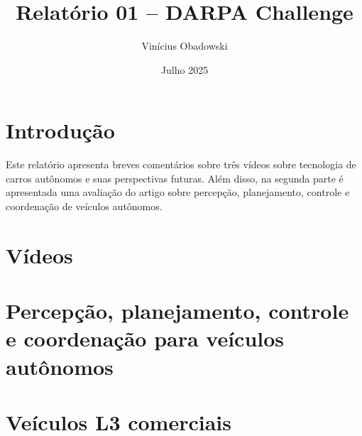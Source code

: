 \documentclass[12pt, a4paper]{article}
\title{Relatório 01 -- DARPA Challenge}
\author{Vinícius Obadowski}
\date{Julho 2025}
\begin{document}
\maketitle

\section{Introdução}

Este relatório apresenta breves comentários sobre três vídeos \cite{cleanerwatt,basicthinking,frankyoutube} sobre tecnologia de carros autônomos e suas perspectivas futuras. Além disso, na segunda parte é apresentada uma avaliação do artigo \cite{Pendleton2017Autonomous} sobre percepção, planejamento, controle e coordenação de veículos autônomos.

\section{Vídeos}



\section{Percepção, planejamento, controle e coordenação para veículos autônomos}



\section{Veículos L3 comerciais}



% 
\printbibliography
\end{document}
